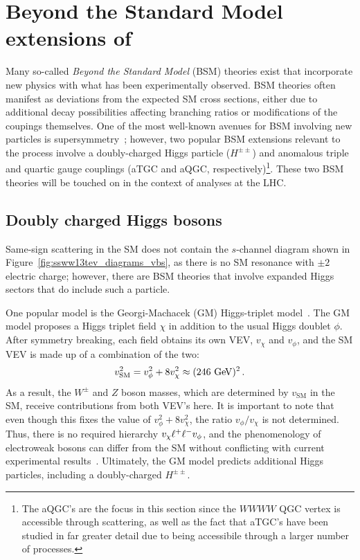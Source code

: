 \section{Beyond the Standard Model extensions of \ssww}\label{ssww13tev:extensions}
Many so-called \emph{Beyond the Standard Model} (BSM) theories exist that incorporate new physics with what has been experimentally observed.
BSM theories often manifest as deviations from the expected SM cross sections, either due to additional decay possibilities affecting branching ratios or modifications of the coupings themselves.
One of the most well-known avenues for BSM involving new particles is supersymmetry~\cite{1997.susy-primer}; however, two popular BSM extensions relevant to the \ssww process involve a doubly-charged Higgs particle ($H^{\pm\pm}$) and anomalous triple and quartic gauge couplings (aTGC and aQGC, respectively)\footnote{The aQGC's are the focus in this section since the $WWWW$ QGC vertex is accessible through \sswwnojj scattering, as well as the fact that aTGC's have been studied in far greater detail due to being accessibile through a larger number of processes.}.
These two BSM theories will be touched on in the context of \ssww analyses at the LHC.

\subsection{Doubly charged Higgs bosons}\label{ssww13tev:hpp}
Same-sign \sswwnojj scattering in the SM does not contain the $s$-channel diagram shown in Figure~\ref{fig:ssww13tev_diagrams_vbs}, as there is no SM resonance with $\pm 2$ electric charge; however, there are BSM theories that involve expanded Higgs sectors that do include such a particle.

One popular model is the Georgi-Machacek (GM) Higgs-triplet model~\cite{1985.doubly-charged-higgs}. 
The GM model proposes a Higgs triplet field $\chi$ in addition to the usual Higgs doublet $\phi$.
After symmetry breaking, each field obtains its own VEV, $v_\chi$ and $v_\phi$, and the SM VEV is made up of a combination of the two:
\begin{equation}
  v_{\textrm{SM}}^2 = v_\phi^2+8 v_\chi^2 \approx (246\gev)^2\,.
\end{equation}
As a result, the $W^\pm$ and $Z$ boson masses, which are determined by $v_{\textrm{SM}}$ in the SM, receive contributions from both VEV's here.
It is important to note that even though this fixes the value of $v_\phi^2+8 v_\chi^2$, the ratio $v_\phi/v_\chi$ is not determined.
Thus, there is no required hierarchy $v_\chi \muchless v_\phi$, and the phenomenology of electroweak bosons can differ from the SM without conflicting with current experimental results~\cite{2013.triplet-higgs-lhc}.
Ultimately, the GM model predicts additional Higgs particles, including a doubly-charged $H^{\pm\pm}$.

